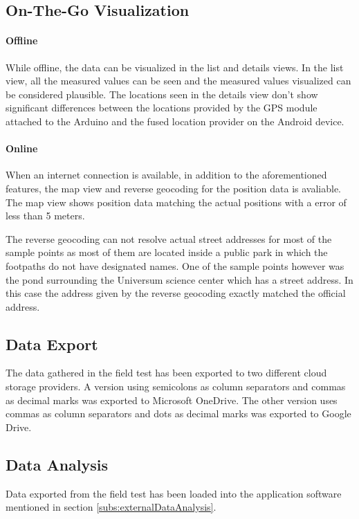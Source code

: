 \subsection{On-The-Go Visualization}
\paragraph{Offline}
While offline, the data can be visualized in the list and details views. In the list view, all the measured values can be seen and the measured values visualized can be considered plausible. The locations seen in the details view don't show significant differences between the locations provided by the GPS module attached to the Arduino and the fused location provider on the Android device.

\paragraph{Online}
When an internet connection is available, in addition to the aforementioned features, the map view and reverse geocoding for the position data is avaliable. The map view shows position data matching the actual positions with a error of less than 5 meters.

The reverse geocoding can not resolve actual street addresses for most of the sample points as most of them are located inside a public park in which the footpaths do not have designated names. One of the sample points however was the pond surrounding the Universum science center which has a street address. In this case the address given by the reverse geocoding exactly matched the official address.

\subsection{Data Export}
The data gathered in the field test has been exported to two different cloud storage providers. A version using semicolons as column separators and commas as decimal marks was exported to Microsoft OneDrive. The other version uses commas as column separators and dots as decimal marks was exported to Google Drive.

\subsection{Data Analysis}
Data exported from the field test has been loaded into the application software mentioned in section \ref{subs:externalDataAnalysis}.  

